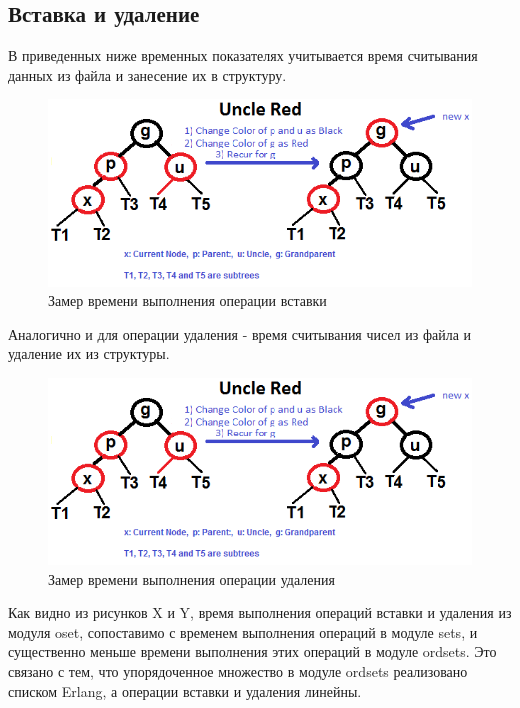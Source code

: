 	\subsection{Вставка и удаление}
		В приведенных ниже временных показателях учитывается время считывания данных из файла и занесение их в структуру.
		\begin{figure}[H]
				\centering
				\includegraphics[width=\textwidth]{img/tan-aus.png}
				\caption{Замер времени выполнения операции вставки}
		\end{figure}
		
		Аналогично и для операции удаления - время считывания чисел из файла и удаление их из структуры. 
		\begin{figure}[H]
				\centering
				\includegraphics[width=\textwidth]{img/tan-aus.png}
				\caption{Замер времени выполнения операции удаления}
		\end{figure}
		
		Как видно из рисунков X и Y, время выполнения операций вставки и удаления из модуля oset, сопоставимо 
		с временем выполнения операций в модуле sets, и существенно меньше времени выполнения этих операций
		в модуле ordsets. Это связано с тем, что упорядоченное множество в модуле ordsets реализовано 
		списком Erlang, а операции вставки и удаления линейны. 	
		
